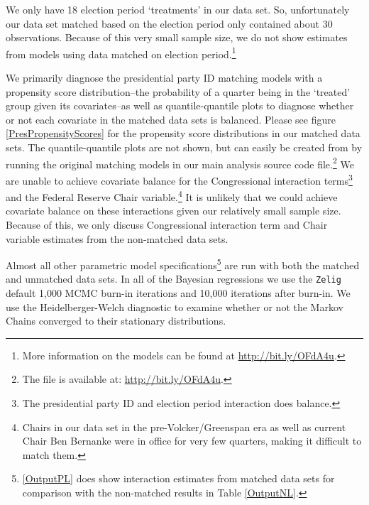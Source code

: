 \documentclass[a4paper]{article}\usepackage{graphicx, color}
\begin{document}
We only have 18 election period `treatments' in our data set. So, unfortunately our data set matched based on the election period only contained about 30 observations. Because of this very small sample size, we do not show estimates from models using data matched on election period.\footnote{More information on the models can be found at \url{http://bit.ly/OFdA4u}.}

We primarily diagnose the presidential party ID matching models with a propensity score distribution--the probability of a quarter being in the `treated' group given its covariates--as well as quantile-quantile plots \citep{Ho2007} to diagnose whether or not each covariate in the matched data sets is balanced. Please see figure \ref{PresPropensityScores} for the propensity score distributions in our matched data sets. The quantile-quantile plots are not shown, but can easily be created from by running the original matching models in our main analysis source code file.\footnote{The file is available at: \url{http://bit.ly/OFdA4u}.}  We are unable to achieve covariate balance for the Congressional interaction terms\footnote{The presidential party ID and election period interaction does balance.} and the Federal Reserve Chair variable.\footnote{Chairs in our data set in the pre-Volcker/Greenspan era as well as current Chair Ben Bernanke were in office for very few quarters, making it difficult to match them.} It is unlikely that we could achieve covariate balance on these interactions given our relatively small sample size. Because of this, we only discuss Congressional interaction term and Chair variable estimates from the non-matched data sets.

Almost all other parametric model specifications\footnote{\ref{OutputPL} does show interaction estimates from matched data sets for comparison with the non-matched results in Table \ref{OutputNL}.} are run with both the matched and unmatched data sets. In all of the Bayesian regressions we use the {\tt{Zelig}} default 1,000 MCMC burn-in iterations and 10,000 iterations after burn-in. We use the Heidelberger-Welch diagnostic to examine whether or not the Markov Chains converged to their stationary distributions.
\end{document}
